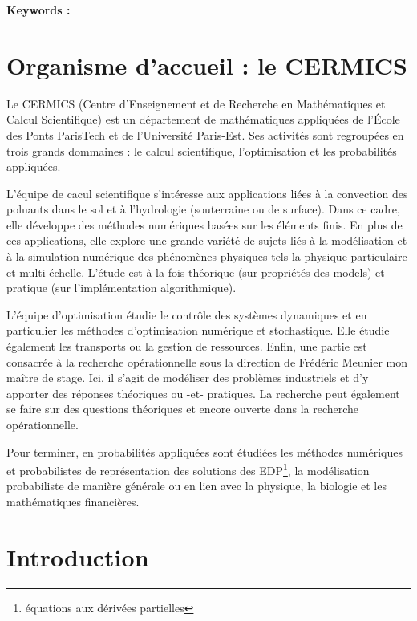 \documentclass[twoside,11pt,openany,a4paper]{rapport}
\begin{document}
\textbf{Keywords :}

\tableofcontents
{}
\listoffigures
{}

\chapter*{Organisme d'accueil : le CERMICS}

Le CERMICS (Centre d'Enseignement et de Recherche en Mathématiques et Calcul Scientifique) est un département de mathématiques appliquées de l'\'Ecole des Ponts ParisTech et de l'Université Paris-Est. Ses activités sont regroupées en trois grands dommaines : le calcul scientifique, l'optimisation et les probabilités appliquées.

L'équipe de cacul scientifique s'intéresse aux applications liées à la convection des poluants dans le sol et à l'hydrologie (souterraine ou de surface). Dans ce cadre, elle développe des méthodes numériques basées sur les éléments finis. En plus de ces applications, elle explore une grande variété de sujets liés à la modélisation et à la simulation numérique des phénomènes physiques tels la physique particulaire et multi-échelle. L'étude est à la fois théorique (sur propriétés des models) et pratique (sur l'implémentation algorithmique).

L'équipe d'optimisation étudie le contrôle des systèmes dynamiques et en particulier les méthodes d'optimisation numérique et stochastique. Elle étudie également les transports ou la gestion de ressources. Enfin, une partie est consacrée à la recherche opérationnelle sous la direction de Frédéric Meunier mon maître de stage. Ici, il s'agit de modéliser des problèmes industriels et d'y apporter des réponses théoriques ou -et- pratiques. La recherche peut également se faire sur des questions théoriques et encore ouverte dans la recherche opérationnelle.

Pour terminer, en probabilités appliquées sont étudiées les méthodes numériques et probabilistes de représentation des solutions des EDP\footnote{équations aux dérivées partielles}, la modélisation probabiliste de manière générale ou en lien avec la physique, la biologie et les mathématiques financières.

\cleardoublepage

\chapter{Introduction}
\end{document}

